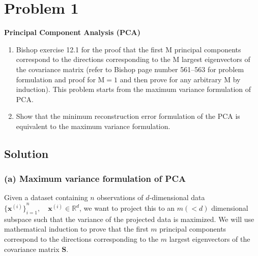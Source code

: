 \section*{Problem 1}

\textbf{Principal Component Analysis (PCA)}

\begin{enumerate}[label= (\alph*), noitemsep, topsep=0pt]
    \item Bishop exercise 12.1 for the proof that the first M principal components correspond to the directions corresponding to the M largest eigenvectors of the covariance matrix (refer to Bishop page number 561--563 for problem formulation and proof for \( \mathrm{M}=1 \) and then prove for any arbitrary M by induction).
          This problem starts from the maximum variance formulation of PCA.\@

    \item Show that the minimum reconstruction error formulation of the PCA is equivalent to the maximum variance formulation.
\end{enumerate}

\subsection*{Solution}

\subsubsection*{(a) Maximum variance formulation of PCA}

Given a dataset containing \( n \) observations of \( d \)-dimensional data \( {\{ \mathbf{x}^{(i)} \}}_{i=1}^{n}, \quad \mathbf{x}^{(i)} \in \mathbb{R}^d \), we want to project this to an \( m (< d) \) dimensional subspace such that the variance of the projected data is maximized.
We will use mathematical induction to prove that the first \( m \) principal components correspond to the directions corresponding to the \( m \) largest eigenvectors of the covariance matrix \( \mathbf{S} \).

